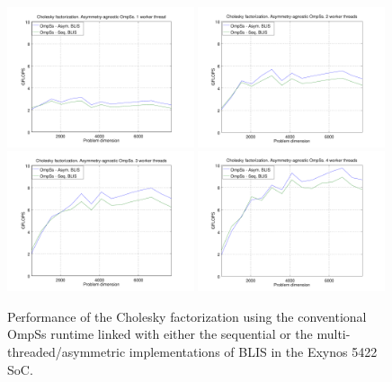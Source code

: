 \begin{figure}[t]
\centering
\includegraphics[width=0.49\textwidth]{Plots/Orig_runtime/plot_1_th}
\includegraphics[width=0.49\textwidth]{Plots/Orig_runtime/plot_2_th}
\includegraphics[width=0.49\textwidth]{Plots/Orig_runtime/plot_3_th}
\includegraphics[width=0.49\textwidth]{Plots/Orig_runtime/plot_4_th}
\caption{Performance of the Cholesky factorization using the conventional OmpSs runtime linked with either
         the sequential or the multi-threaded/asymmetric implementations of
         BLIS %
         in the Exynos 5422 SoC.}
\label{fig:ompss_blis}
\end{figure}


